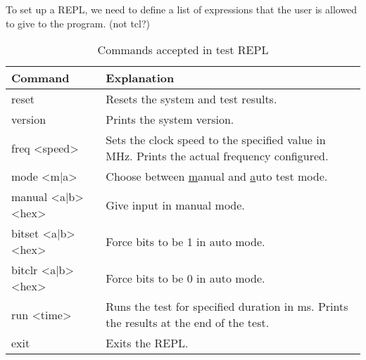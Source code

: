 To set up a REPL, we need to define a list of expressions that the user is allowed to give to the program. (not tcl?)
\begin{table}[H]
  \centering
  \begin{tabular}{|>{\ttfamily}p{11em}|p{\dimexpr\textwidth-18em}|}
    \hline
    \textrm{Command}   & Explanation \\
    \hline
    reset              & Resets the system and test results. \\
    version            & Prints the system version. \\
    freq <speed>       & Sets the clock speed to the specified value in MHz. Prints the actual frequency configured. \\
    mode <m|a>         & Choose between \underline{m}anual and \underline{a}uto test mode. \\
    manual <a|b> <hex>  & Give input in manual mode. \\
    bitset <a|b> <hex>  & Force bits to be 1 in auto mode. \\
    bitclr <a|b> <hex>  & Force bits to be 0 in auto mode. \\
    run <time>         & Runs the test for specified duration in ms. Prints the results at the end of the test. \\
    exit               & Exits the REPL. \\
    \hline
  \end{tabular}
  \caption{Commands accepted in test REPL}
\end{table}
